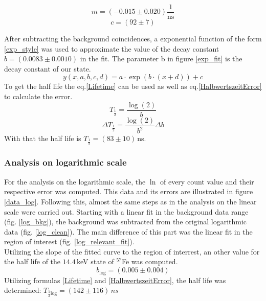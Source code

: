 \documentclass[30pt,a4paper]{article}
\begin{document}
 	\begin{equation*}
 	m = (-0.015 \pm 0.020)\frac{1}{\textrm{ns}}
 	\end{equation*}
 	$$c = (92 \pm 7)$$
 	
 	
 	
 
 	
 	\FloatBarrier
 	After subtracting the background coincidences, a exponential function of the form
 	\ref{exp_style} was used to approximate the value of the decay constant $b=(0.0083\pm0.0010)$ in the fit. The parameter b in figure \ref{exp_fit} is the decay constant of our state. 
 	\begin{equation}
 	y\left(x,a,b,c,d\right) = a \cdot \exp\left(b\cdot\left(x+d\right)\right) + c
 	\label{exp_style}
 	\end{equation}
 	To get the half life the eq.\ref{Lifetime} can be used as well as eq.\ref{HalbwertszeitError} to calculate the error.
 	\begin{equation}
 	T_\frac{1}{2}=\frac{\log(2)}{b}
 	\label{Lifetime} 
 	\end{equation}
 	\begin{equation}
 	\Delta T_\frac{1}{2}=\frac{\log(2)}{b^2}\Delta b
 	\label{HalbwertszeitError} 
 	\end{equation}
 	With that the half life is $T_\frac{1}{2}=(83\pm10)$\,ns.
	\subsubsection{Analysis on logarithmic scale}
	For the analysis on the logarithmic scale, the $\ln$ of every count value and their
	respective error was computed. This data and its errors are illustrated in figure 
	\ref{data_log}. Following this, almost the same steps as in the analysis on the linear scale
	were carried out. Starting with a linear fit in the background data range (fig. \ref{log_bkg}), the background was subtracted from the original logarithmic data (fig. \ref{log_clean}). The main difference of this part was the linear fit 
	in the region of interest (fig. \ref{log_relevant_fit}).\\
	Utilizing the slope of the fitted curve to the region of interrest, an other value for the half life of the $14.4$\,keV state of $^{57}$Fe was computed.
	$$b_{\textrm{log}} = (0.005\pm0.004)$$
	Utilizing formulas \ref{Lifetime} and \ref{HalbwertszeitError}, the half life was
	determined:	$T_{\frac{1}{2} \textrm{log}} = (142\pm 116)\,ns$
	
\end{document}
